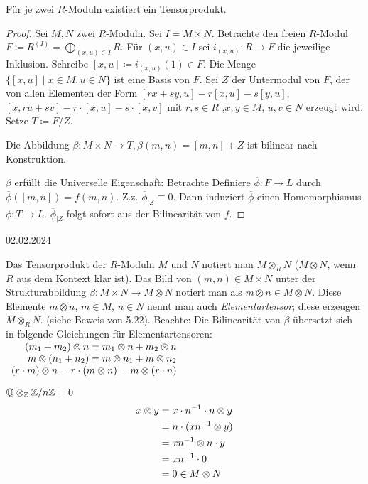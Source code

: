 \documentclass[../main.tex]{subfiles}
\begin{document}
\begin{theorem}
    Für je zwei $R$-Moduln existiert ein Tensorprodukt.
\end{theorem}
\begin{proof}
    Sei $M,N$ zwei $R$-Moduln. Sei $I=M\times N$.
    Betrachte den freien $R$-Modul $F\coloneqq R^{(I)} = \bigoplus_{(x,u)\in I} R$.
    Für $(x,u)\in I$ sei $i_{(x,u)}:R\rightarrow F$ die jeweilige Inklusion.
    Schreibe $[x,u] \coloneqq i_{(x,u)} (1)\in F$.
    Die Menge $\{[x,u]\mid x\in M, u\in N\}$ ist eine Basis von $F$.
    Sei $Z$ der Untermodul von $F$, der von allen Elementen der Form $[rx+sy,u] - r[x,u] - s[y,u]$,
    $[x, ru+sv] - r\cdot [x,u] - s\cdot [x,v]$ mit $r,s\in R$ ,$x,y\in M$, $u,v\in N$ erzeugt wird.
    Setze $T\coloneqq F/Z.$

    Die Abbildung $\beta:M\times N \rightarrow T, \beta(m,n) = [m,n]+Z$ ist bilinear nach Konstruktion.

    $\beta$ erfüllt die Universelle Eigenschaft:
    Betrachte 
    Definiere $\overline{\phi}:F\rightarrow L$ durch $\overline{\phi} ([m,n]) = f(m,n)$.
    Z.z. $\overline{\phi}_{|Z} \equiv 0$. Dann induziert $\overline{\phi}$ einen Homomorphismus $\phi: T\rightarrow L$.
    $\overline{\phi}_{|Z}$ folgt sofort aus der Bilinearität von $f$.
\end{proof}
\begin{flushright}
    02.02.2024
\end{flushright}
\begin{remark}[Notation]
    Das Tensorprodukt der $R$-Moduln $M$ und $N$ notiert man ${M\otimes_R N}$
    ($M\otimes N$, wenn $R$ aus dem Kontext klar ist).
    Das Bild von $(m,n)\in M\times N$ unter der Strukturabbildung $\beta: M\times N \rightarrow M\otimes N$ notiert man als $m\otimes n\in M\otimes N$.
    Diese Elemente $m\otimes n$, $m\in M$, $n\in N$ nennt man auch \emph{Elementartensor}; diese erzeugen $M\otimes_R N$. (siehe Beweis von 5.22).
    Beachte: Die Bilinearität von $\beta$ übersetzt sich in folgende Gleichungen für Elementartensoren:$\begin{array}[t]{r}
(m_1 + m_2)\otimes n = m_1\otimes n + m_2 \otimes n \\
m\otimes (n_1 + n_2)=m\otimes n_1 + m\otimes n_2 \\
(r\cdot m)\otimes n = r\cdot (m\otimes n) = m\otimes (r\cdot n)
\end{array}$
\end{remark}
\begin{example}
    $\mathbb{Q}\otimes_{\mathbb{Z}} \mathbb{Z}/n\mathbb{Z} = 0$
    \begin{align*}
        x\otimes y &= x\cdot n^{-1}\cdot n \otimes y\\
        &= n\cdot (xn^{-1}\otimes y)\\
        &= xn^{-1}\otimes n\cdot y\\
        &= xn^{-1}\cdot 0\\
        &= 0\in M\otimes N
    \end{align*}
\end{example}
\end{document}
